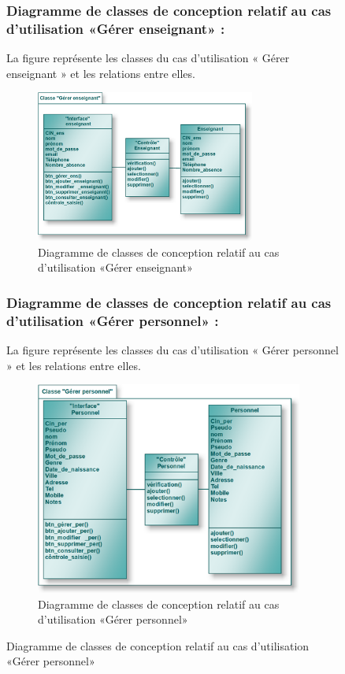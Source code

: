 \documentclass[12 pt]{report}
\begin{document}
\begin{figure}[h]
\begin{center}
\subsubsection{Diagramme de classes de conception relatif au cas d’utilisation «Gérer enseignant» :}
La figure  représente les classes du cas d’utilisation « Gérer enseignant » et les relations entre elles.
\begin{figure}[h]
 \begin{center}
\includegraphics[width= 11 cm ,height= 5cm]{cl_ge.PNG}
\caption{Diagramme de classes de conception relatif au cas d’utilisation «Gérer enseignant»}

\end{center}
\end{figure}

\subsubsection{Diagramme de classes de conception relatif au cas d’utilisation «Gérer personnel» :}
La figure  représente les classes du cas d’utilisation « Gérer personnel » et les relations entre elles.
\begin{figure}[h]
 \begin{center}
\includegraphics[width= 11 cm ,height=  7cm]{cl_gp.PNG}
\caption{Diagramme de classes de conception relatif au cas d’utilisation «Gérer personnel» }


\end{center}
\end{figure}
\end{center}
\end{figure}
\end{document}
